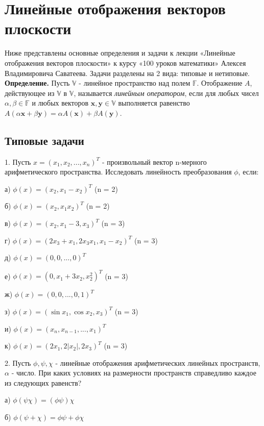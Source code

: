\documentclass[12pt]{article}
\begin{document}
\section*{Линейные отображения векторов плоскости}
Ниже представлены основные определения и задачи к лекции «Линейные отображения векторов плоскости» к курсу «100 уроков математики» Алексея Владимировича Саватеева.
Задачи разделены на 2 вида: типовые и нетиповые.
\\

\textbf{Определение.} Пусть $\mathbb V$ - линейное пространство над полем $\mathbb F$. Отображение $A$, действующее из $\mathbb V$ в $\mathbb V$, называется \textit{линейным оператором}, если для любых чисел $\alpha, \beta \in \mathbb F$ и любых векторов $\textbf{x},\textbf{y} \in \mathbb V$ выполняется равенство $A(\alpha \textbf{x} + \beta \textbf{y}) = \alpha A(\textbf{x}) + \beta A(\textbf{y})$.

\subsection*{Типовые задачи}


1. Пусть  $x = (x_{1}, x_{2}, ..., x_{n})^T $ - произвольный вектор n-мерного арифметического пространства. Исследовать линейность преобразования $\phi$, если:

а) $\phi(x) = (x_{2}, x_{1} - x_{2})^T$ (n = 2)

б) $\phi(x) = (x_{2}, x_{1}x_{2})^T$ (n = 2)

в) $\phi(x) = (x_{2}, x_{1}-3, x_{3})^T$ (n = 3)

г) $\phi(x) = (2x_{3} + x_{1},2x_{3}x_{1},x_{1} - x_{2})^T$ (n = 3)

д) $\phi(x) = (0, 0, ..., 0)^T$

е) $\phi(x) = (0, x_{1} + 3x_{2}, x_{2}^2)^T$ (n = 3)

ж) $\phi(x) = (0, 0, ..., 0, 1)^T$

з) $\phi(x) = (\sin x_{1}, \cos x_{2}, x_{3})^T$ (n = 3)

и) $\phi(x) = (x_{n}, x_{n-1}, ..., x_{1})^T$

к) $\phi(x) = (2x_{1}, 2|x_{2}|, 2x_{3})^T$ (n = 3)

2. Пусть $\phi, \psi, \chi$ - линейные отображения арифметических линейных пространств, $\alpha$ - число. При каких условиях на размерности пространств справедливо каждое из следующих равенств?

а) $\phi(\psi\chi) = (\phi\psi)\chi$

б) $\phi(\psi + \chi) = \phi\psi + \phi\chi$
\end{document}

